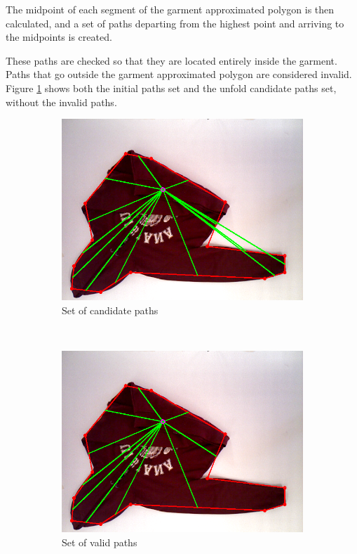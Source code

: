 The midpoint of each segment of the garment approximated polygon is then calculated, and a set of paths departing from the highest point and arriving to the midpoints is created.

These paths are checked so that they are located entirely inside the garment. Paths that go outside the garment approximated polygon are considered invalid. Figure \ref{fig:candidate_paths} shows both the initial paths set and the unfold candidate paths set, without the invalid paths.


\begin{figure}[htbp]
	\centering
    \begin{subfigure}[l]{0.49\textwidth}
	    \centering
    	\includegraphics[width=\textwidth]
    	{figures/paths_candidate.png}
    	\caption{Set of candidate paths}
	\end{subfigure}
	~
    \begin{subfigure}[r]{0.49\textwidth}
	    \centering
    	\includegraphics[width=\textwidth]
    	{figures/paths_valid.png}
    	\caption{Set of valid paths}
	\end{subfigure} 
    \caption{}
    \label{fig:candidate_paths}
\end{figure}


